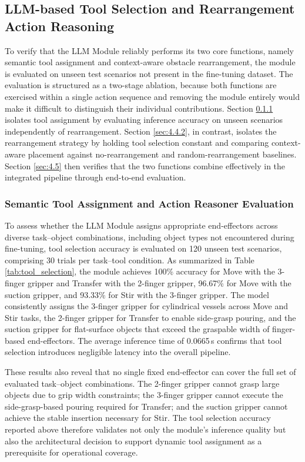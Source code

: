 \documentclass{ieeeaccess}
\begin{document}
\subsection{LLM-based Tool Selection and Rearrangement Action Reasoning}\label{sec:4.4}
To verify that the LLM Module reliably performs its two core functions, namely semantic tool assignment and context-aware obstacle rearrangement, the module is evaluated on unseen test scenarios not present in the fine-tuning dataset. The evaluation is structured as a two-stage ablation, because both functions are exercised within a single action sequence and removing the module entirely would make it difficult to distinguish their individual contributions. Section \ref{sec:4.4.1} isolates tool assignment by evaluating inference accuracy on unseen scenarios independently of rearrangement. Section \ref{sec:4.4.2}, in contrast, isolates the rearrangement strategy by holding tool selection constant and comparing context-aware placement against no-rearrangement and random-rearrangement baselines. Section \ref{sec:4.5} then verifies that the two functions combine effectively in the integrated pipeline through end-to-end evaluation.

\subsubsection{Semantic Tool Assignment and Action Reasoner Evaluation}\label{sec:4.4.1}
To assess whether the LLM Module assigns appropriate end-effectors across diverse task--object combinations, including object types not encountered during fine-tuning, tool selection accuracy is evaluated on 120 unseen test scenarios, comprising 30 trials per task--tool condition. As summarized in Table \ref{tab:tool_selection}, the module achieves 100\% accuracy for Move with the 3-finger gripper and Transfer with the 2-finger gripper, 96.67\% for Move with the suction gripper, and 93.33\% for Stir with the 3-finger gripper. The model consistently assigns the 3-finger gripper for cylindrical vessels across Move and Stir tasks, the 2-finger gripper for Transfer to enable side-grasp pouring, and the suction gripper for flat-surface objects that exceed the graspable width of finger-based end-effectors. The average inference time of 0.0665\,s confirms that tool selection introduces negligible latency into the overall pipeline.

These results also reveal that no single fixed end-effector can cover the full set of evaluated task--object combinations. The 2-finger gripper cannot grasp large objects due to grip width constraints; the 3-finger gripper cannot execute the side-grasp-based pouring required for Transfer; and the suction gripper cannot achieve the stable insertion necessary for Stir. The tool selection accuracy reported above therefore validates not only the module's inference quality but also the architectural decision to support dynamic tool assignment as a prerequisite for operational coverage.
\end{document}

